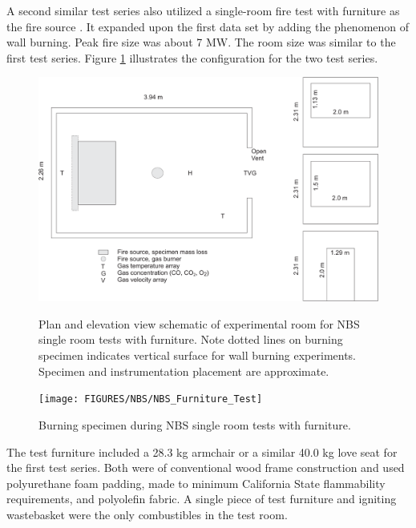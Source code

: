 A second similar test series also utilized a single-room fire test with furniture as the fire source \cite{Lee:1985}. It expanded upon the first data set by adding the phenomenon of wall burning. Peak fire size was about 7 MW. The room size was similar to the first test series. Figure \ref{fig:NBSFurniture} illustrates the configuration for the two test series.

\begin{figure}[\figoptions{b}]
\begin{center}
\includegraphics[width=5.0in]{FIGURES/NBS/NBSFurniture}\\
\end{center}
\caption[Plan and elevation view schematic of experimental room for NBS single room tests with furniture.]{Plan and elevation view schematic of experimental room for NBS single room tests with furniture. Note dotted lines on burning specimen indicates vertical surface for wall burning experiments.  Specimen and instrumentation placement are approximate.}
 \label{fig:NBSFurniture}
\end{figure}

\begin{figure}[\figoptions{b}]
\begin{center}
\texttt{[image: FIGURES/NBS/NBS\_Furniture\_Test]}\\
\end{center}
\caption[Burning specimen during NBS single room tests with furniture.]{Burning specimen during NBS single room tests with furniture.}
 \label{fig:NBSFurniturePix}
\end{figure}

The test furniture included a 28.3 kg armchair or a similar 40.0 kg love seat for the first test series. Both were of conventional wood frame construction and used polyurethane foam padding, made to minimum California State flammability requirements, and polyolefin fabric. A single piece of test furniture and igniting wastebasket were the only combustibles in the test room.

